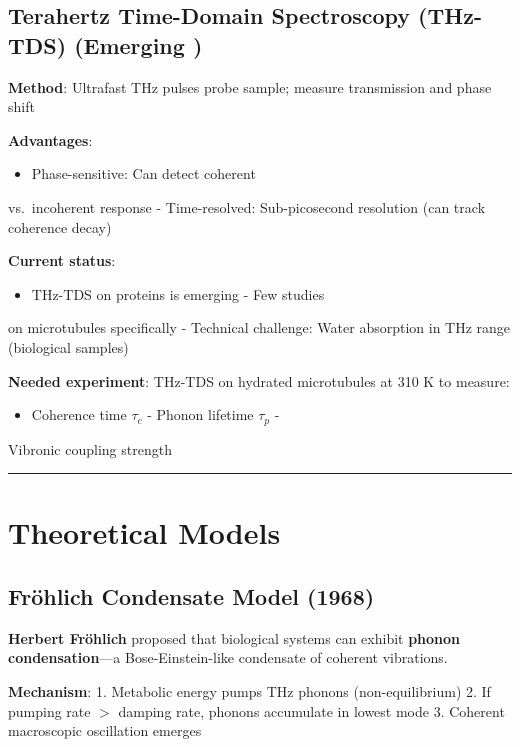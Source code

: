 \subsection{Terahertz Time-Domain Spectroscopy (THz-TDS)
(Emerging )}\label{terahertz-time-domain-spectroscopy-thz-tds-emerging}

\textbf{Method}: Ultrafast THz pulses probe sample; measure transmission
and phase shift

\textbf{Advantages}:
\begin{itemize}
\item Phase-sensitive: Can detect coherent
\end{itemize}

vs.~incoherent response - Time-resolved: Sub-picosecond resolution (can
track coherence decay)

\textbf{Current status}:
\begin{itemize}
\item THz-TDS on proteins is emerging - Few studies
\end{itemize}

on microtubules specifically - Technical challenge: Water absorption in
THz range (biological samples)

\textbf{Needed experiment}: THz-TDS on hydrated microtubules at 310 K to
measure:
\begin{itemize}
\item Coherence time \(\tau_c\) - Phonon lifetime \(\tau_p\) -
\end{itemize}

Vibronic coupling strength

\begin{center}\rule{0.5\linewidth}{0.5pt}\end{center}

\section{Theoretical Models}\label{theoretical-models}

\subsection{Fröhlich Condensate Model
(1968)}\label{fruxf6hlich-condensate-model-1968}

\textbf{Herbert Fröhlich} proposed that biological systems can exhibit
\textbf{phonon condensation}---a Bose-Einstein-like condensate of
coherent vibrations.

\textbf{Mechanism}: 1. Metabolic energy pumps THz phonons
(non-equilibrium) 2. If pumping rate $>${} damping rate,
phonons accumulate in lowest mode 3. Coherent macroscopic oscillation
emerges

